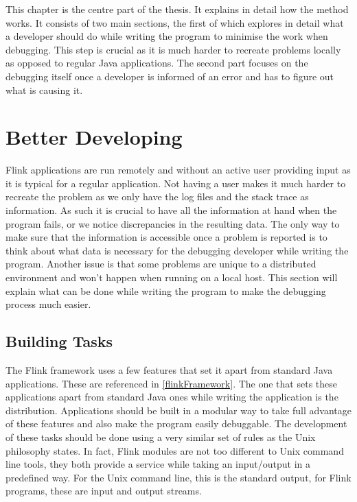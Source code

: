 
This chapter is the centre part of the thesis. It explains in detail how the method works. It consists of two main sections, the first of which explores in detail what a developer should do while writing the program to minimise the work when debugging. This step is crucial as it is much harder to recreate problems locally as opposed to regular Java applications. The second part focuses on the debugging itself once a developer is informed of an error and has to figure out what is causing it.

\section{Better Developing}
Flink applications are run remotely and without an active user providing input as it is typical for a regular application. Not having a user makes it much harder to recreate the problem as we only have the log files and the stack trace as information. As such it is crucial to have all the information at hand when the program fails, or we notice discrepancies in the resulting data. The only way to make sure that the information is accessible once a problem is reported is to think about what data is necessary for the debugging developer while writing the program. Another issue is that some problems are unique to a distributed environment and won't happen when running on a local host. This section will explain what can be done while writing the program to make the debugging process much easier.

\subsection{Building Tasks}
The Flink framework uses a few features that set it apart from standard Java applications. These are referenced in \ref{flinkFramework}. The one that sets these applications apart from standard Java ones while writing the application is the distribution. Applications should be built in a modular way to take full advantage of these features and also make the program easily debuggable.
The development of these tasks should be done using a very similar set of rules as the Unix philosophy states. In fact, Flink modules are not too different to Unix command line tools, they both provide a service while taking an input/output in a predefined way. For the Unix command line, this is the standard output, for Flink programs, these are input and output streams.

